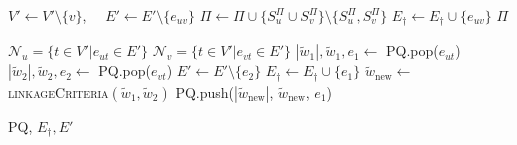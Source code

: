 \begin{algorithm}
\begin{algorithmic}[1]
          \State $V' \gets V' \setminus \{ v\}$, $\quad E' \gets E' \setminus \{ e_{uv}\}$
          \State $\Pi \gets \Pi \cup \{ S_u^\Pi \cup S_v^\Pi \} \setminus \{ S_u^\Pi, S_v^\Pi \}$
        \EndIf
          \State $ E_\dagger \gets E_\dagger \cup \{e_{uv} \} $
        \EndIf
      \EndWhile
      \State
      \Return $\Pi$

  \end{algorithmic}
  \hspace*{2cm} 
    \begin{algorithmic}[1]

      \State $\mathcal{N}_u = \{ t \in V' | e_{ut}\in E'  \}$
      \State $\mathcal{N}_v = \{ t \in V' | e_{vt}\in E'  \}$
        \State $|\tilde{w}_1|, \tilde{w}_1, e_1 \gets $ PQ.pop($e_{ut}$)
        \State $|\tilde{w}_2|, \tilde{w}_2, e_2 \gets $ PQ.pop($e_{vt}$)
        \State $E' \gets E' \setminus \{ e_2\}$ %
         
            \State $ E_\dagger \gets E_\dagger \cup \{e_1 \} $
        \EndIf
        \State $\tilde{w}_{\mathrm{new}} \gets$ \textsc{linkageCriteria}$(\tilde{w}_1, \tilde{w}_2)$
        \State PQ.push($|\tilde{w}_{\mathrm{new}}|$, $\tilde{w}_{\mathrm{new}}$,  $e_1$)
        
        
      \EndFor
      
      \State
      \Return PQ, $E_\dagger, E'$


    \EndFunction

  \end{algorithmic}
  
\end{algorithm}
